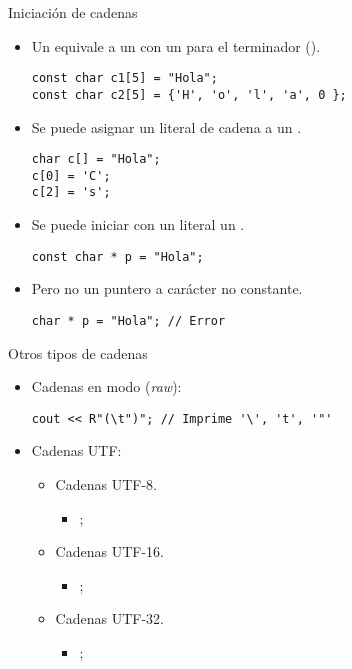 \begin{frame}[t,fragile]{Iniciación de cadenas}
\begin{itemize}
  \item Un  equivale a 
        un  con 
        un  para el terminador (). 
\begin{lstlisting}
const char c1[5] = "Hola";
const char c2[5] = {'H', 'o', 'l', 'a', 0 };
\end{lstlisting}

  \item Se puede asignar un literal de cadena a un .
\begin{lstlisting}
char c[] = "Hola";
c[0] = 'C';
c[2] = 's';
\end{lstlisting}

  \item Se puede iniciar con un literal un .
\begin{lstlisting}
const char * p = "Hola";
\end{lstlisting}

  \item Pero no un puntero a carácter no constante.
\begin{lstlisting}
char * p = "Hola"; // Error
\end{lstlisting}
\end{itemize}
\end{frame}

\begin{frame}[t,fragile]{Otros tipos de cadenas}
\begin{itemize}
  \item Cadenas en modo  (\emph{raw}):
\begin{lstlisting}
cout << R"(\t")"; // Imprime '\', 't', '"'
\end{lstlisting}

  \item Cadenas UTF:
    \begin{itemize}
      \item Cadenas UTF-8.
        \begin{itemize}
          \item {};
        \end{itemize}
      \item Cadenas UTF-16.
        \begin{itemize}
          \item {};
        \end{itemize}
      \item Cadenas UTF-32.
        \begin{itemize}
          \item {};
        \end{itemize}
    \end{itemize}
\end{itemize}
\end{frame}

